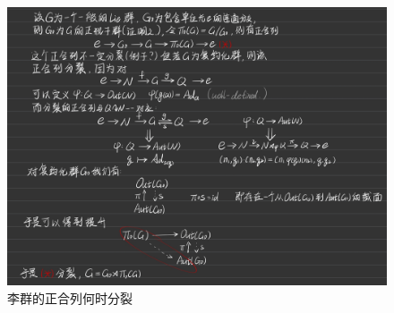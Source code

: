 \begin{figure}[htpb]
    \centering
    \includegraphics[scale = 0.18]{Figures/20240926-223647.jpg}
    \caption{李群的正合列何时分裂}
\end{figure}